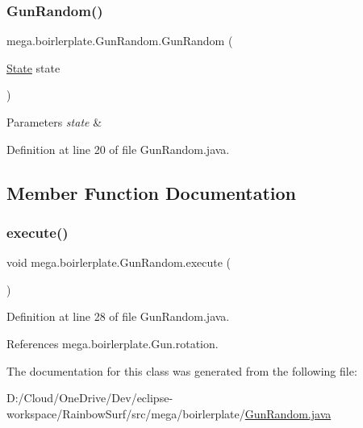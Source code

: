 \subsubsection{\texorpdfstring{Gun\+Random()}{GunRandom()}}
{\footnotesize\ttfamily mega.\+boirlerplate.\+Gun\+Random.\+Gun\+Random (\begin{DoxyParamCaption}\item[{\hyperlink{classmega_1_1boirlerplate_1_1_state}{State}}]{state }\end{DoxyParamCaption})}


\begin{DoxyParams}{Parameters}
{\em state} & \\
\hline
\end{DoxyParams}


Definition at line 20 of file Gun\+Random.\+java.



\subsection{Member Function Documentation}
\mbox{\label{classmega_1_1boirlerplate_1_1_gun_random_a05e61f1fb87a48a1c2590fe1f8086540}} 
\subsubsection{\texorpdfstring{execute()}{execute()}}
{\footnotesize\ttfamily void mega.\+boirlerplate.\+Gun\+Random.\+execute (\begin{DoxyParamCaption}{ }\end{DoxyParamCaption})}



Definition at line 28 of file Gun\+Random.\+java.



References mega.\+boirlerplate.\+Gun.\+rotation.



The documentation for this class was generated from the following file\+:\begin{DoxyCompactItemize}
\item 
D\+:/\+Cloud/\+One\+Drive/\+Dev/eclipse-\/workspace/\+Rainbow\+Surf/src/mega/boirlerplate/\hyperlink{_gun_random_8java}{Gun\+Random.\+java}\end{DoxyCompactItemize}

